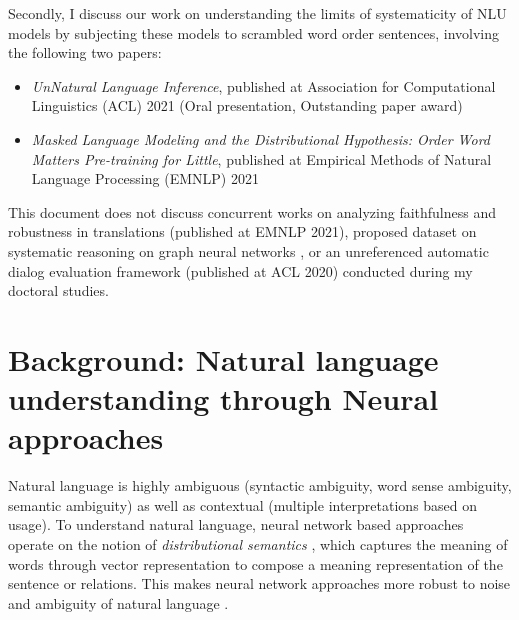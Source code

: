 \documentclass[12pt]{article}
\begin{document}
Secondly, I discuss our work on understanding the limits of systematicity of NLU models by subjecting these models to scrambled word order sentences, involving the following two papers:

\begin{itemize}
  \item \textit{UnNatural Language Inference}, published at Association for Computational Linguistics (ACL) 2021 (Oral presentation, Outstanding paper award) \cite{sinha2021}
  \item \textit{Masked Language Modeling and the Distributional Hypothesis: Order Word Matters Pre-training for Little}, published at Empirical Methods of Natural Language Processing (EMNLP) 2021 \cite{sinha2021a}
\end{itemize}

This document does not discuss concurrent works on analyzing faithfulness and robustness in translations \cite{parthasarathi2021a} (published at EMNLP 2021), proposed dataset on systematic reasoning on graph neural networks \cite{sinha2020c}, or an unreferenced automatic dialog evaluation framework \cite{sinha2020d} (published at ACL 2020) conducted during my doctoral studies.






\section{Background: Natural language understanding through Neural approaches}

Natural language is highly ambiguous (syntactic ambiguity, word sense ambiguity, semantic ambiguity) as well as contextual (multiple interpretations based on usage). To understand natural language, neural network based approaches operate on the notion of \textit{distributional semantics} \cite{bordes2013translating}, which captures the meaning of words through vector representation to compose a meaning representation of the sentence or relations. This makes neural network approaches more robust to noise and ambiguity of natural language \cite{bengio2013representation}.
\end{document}

